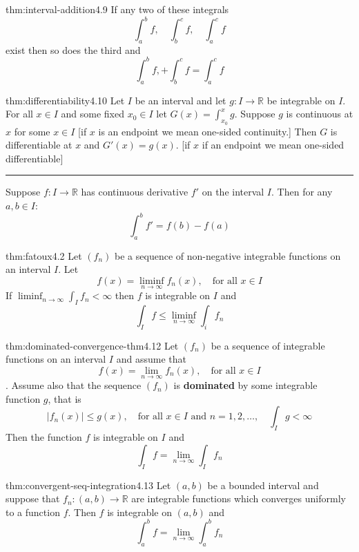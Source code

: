 \documentclass[landscape, 8pt]{extarticle}
\begin{document}
\begin{multicols}{3}
\begin{thm}{thm:interval-addition}{4.9}
	If any two of these integrals
	\[\int_{a}^{b} f, \quad \int_{b}^{c} f, \quad \int_{a}^{c} f\]
	exist then so does the third and
	\[\int_{a}^{b} f, + \int_{b}^{c} f = \int_{a}^{c} f\]
\end{thm}

\begin{thm}{thm:differentiability}{4.10}
	Let $I$ be an interval and let $g : I \to \mathbb{R}$ be integrable on $I$. For all $x\in I$ and some fixed $x_{0}\in I$ let $G(x) = \int_{x_{0}}^{x}g$. Suppose $g$ is continuous at $x$ for some $x\in I$ [if $x$ is an endpoint we mean one-sided continuity.] Then $G$ is differentiable at $x$ and $G'(x) = g(x)$. [if $x$ if an endpoint we mean one-sided differentiable]

	\noindent\rule{\textwidth}{0.2pt}
	Suppose $f : I \to \mathbb{R}$ has continuous derivative $f'$ on the interval $I$. Then for any $a, b\in I$:
	\[\int_{a}^{b} f' = f(b) - f(a) \]
\end{thm}

\begin{lma}{thm:fatoux}{4.2}
	Let $(f_{n})$ be a sequence of non-negative integrable functions on an interval $I$. Let
	\[f(x) = \liminf_{n\to \infty} f_{n}(x),\quad\text{for all $x\in I$}\]
	If $\liminf_{n\to \infty}\int_{I} f_{n} < \infty$ then $f$ is integrable on $I$ and
	\[\int_{I} f \le \liminf_{n\to \infty}\int_{i} f_{n}\]
\end{lma}

\begin{thm}{thm:dominated-convergence-thm}{4.12}
	Let $(f_{n})$ be a sequence of integrable functions on an interval $I$ and assume that
	\[f(x) = \lim_{n\to \infty} f_{n}(x), \quad \text{for all $x\in I$}\].
	Assume also that the sequence $(f_{n})$ is \textbf{dominated} by some integrable function $g$, that is
	\[\lvert f_{n}(x) \rvert \le g(x),\quad \text{for all $x\in I$ and $n = 1,2,\dots,$} \quad \int_{I} g < \infty\]
	Then the function $f$ is integrable on $I$ and
	\[\int_{I} f = \lim_{n\to \infty} \int_{I} f_{n}\]
\end{thm}

\begin{thm}[]{thm:convergent-seq-integration}{4.13}
	Let $(a, b)$ be a bounded interval and suppose that $f_{n} : (a, b) \to \mathbb{R}$ are integrable functions which converges uniformly to a function $f$. Then $f$ is integrable on $(a, b)$ and
	\[\int_{a}^{b} f = \lim_{n\to \infty} \int_{a}^{b} f_{n} \]
\end{thm}


\end{multicols}
\end{document}
